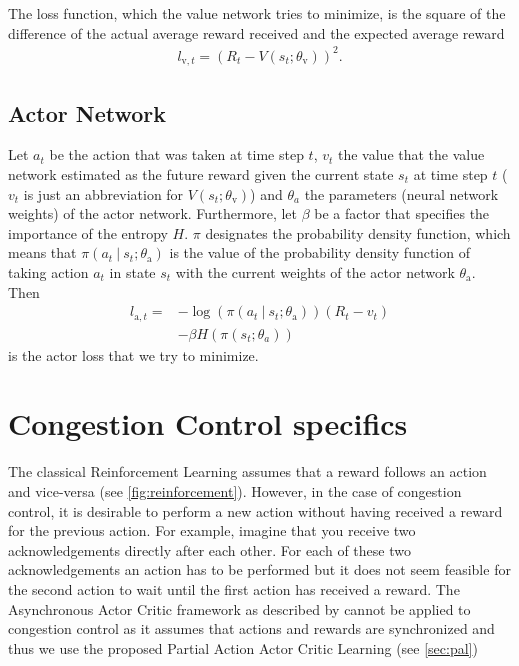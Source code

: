\documentclass[sigconf]{acmart}
\newcommand\givenbase[1][]{\:#1\lvert\:}
\let\given\givenbase
\begin{document}
The loss function, which the value network tries to minimize, is the square of the difference of the actual average reward received and the expected average reward
\begin{align*}
l_{\text{v},t} = \left(R_t - V(s_t; \theta_\text{v})\right)^2.
\end{align*}

\subsection{Actor Network}
\label{subsec:genericactor}

Let $a_t$ be the action that was taken at time step $t$, $v_t$ the value that the value network estimated as the future reward given the current state $s_t$ at time step $t$ ($v_t$ is just an abbreviation for $V(s_t; \theta_\text{v})$) and $\theta_a$ the parameters (neural network weights) of the actor network. Furthermore, let $\beta$ be a factor that specifies the importance of the entropy $H$. $\pi$ designates the probability density function, which means that $\pi\left( a_t \given s_t; \theta_\text{a} \right)$ is the value of the probability density function of taking action $a_t$ in state $s_t$ with the current weights of the actor network $\theta_\text{a}$. Then
\begin{align*}
l_{\text{a},t} =& -\log \left( \pi\left( a_t \given s_t; \theta_\text{a} \right)\right)\left( R_t - v_t \right)\\ 
&- \beta H\left( \pi\left( s_t; \theta_a \right)\right)
\end{align*}
is the actor loss that we try to minimize. 

\section{Congestion Control specifics}

The classical Reinforcement Learning assumes that a reward follows an action and vice-versa (see \autoref{fig:reinforcement}). However, in the case of congestion control, it is desirable to perform a new action without having received a reward for the previous action. For example, imagine that you receive two acknowledgements directly after each other. For each of these two acknowledgements an action has to be performed but it does not seem feasible for the second action to wait until the first action has received a reward. The Asynchronous Actor Critic framework as described by \cite{mnih_asynchronous_2016} cannot be applied to congestion control as it assumes that actions and rewards are synchronized and thus we use the proposed Partial Action Actor Critic Learning (see \autoref{sec:pal})
\end{document}

